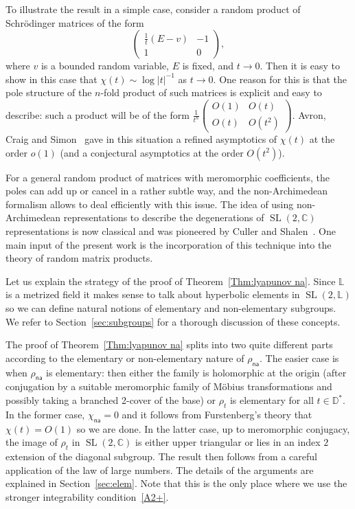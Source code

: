 \documentclass[10pt]{amsart}
\theoremstyle{definition}\newtheorem{defi}[theo]{Definition}\newtheorem{rema}[theo]{Remark}\newtheorem{exam}[theo]{Example}\newtheorem{exem}[theo]{Example}\newtheorem{nota}[theo]{Notation}
\DeclareMathOperator{\SL}{SL}
\newcommand{\D}{\mathbb{D}}
\newcommand{\abs}[1]{\left\vert#1\right\vert}
\newcommand{\Laurent}{\mathbb{L}}
\newcommand{\unsur}[1]{\frac{1}{#1}}
\newcommand{\lrpar}[1]{\left(#1\right)}
\newcommand{\na}{\mathsf{na}}
\newcommand{\SLC}{\SL(2,\mathbb C)}
\newcommand{\inv}{^{-1}}
\begin{document}
To illustrate the result in a simple case, consider a random product of Schr\"odinger matrices of the form
\begin{equation}
\label{eq:schrodinger matrix}
\begin{pmatrix} {\unsur{t}(E-v)} & -1 \\ 1 & 0
\end{pmatrix},
\end{equation}
where $v$ is a bounded random variable, $E$ is fixed, and $t\to 0$. Then it is easy to show in this case that $\chi(t)\sim \log\abs{t}\inv$ as $t\to 0$. One reason for this is that the pole structure of the $n$-fold product of such matrices is explicit and easy to describe: such a product will be of the form $\unsur{t^n}\lrpar{
\begin{smallmatrix} O(1) & O(t) \\ O(t) & O(t^2)
\end{smallmatrix}}$.
Avron, Craig and Simon~\cite{avron-craig-simon} gave in this situation a refined asymptotics of $\chi(t)$ at the order $o(1)$ (and a conjectural asymptotics at the order $O(t^{2})$).

For a general random product of matrices with meromorphic coefficients, the poles can add up or cancel in a rather subtle way, and the non-Archimedean formalism allows to deal efficiently with this issue. The idea of using non-Archimedean representations to describe the degenerations of $\SLC$ representations is now classical and was pioneered by Culler and Shalen~\cite{culler-shalen}. One main input of the present work is the incorporation of this technique into the theory of random matrix products.

Let us explain the strategy of the proof of Theorem~\ref{Thm:lyapunov na}. Since $\Laurent$ is a metrized field it makes sense to talk about hyperbolic elements in $\SL(2,\Laurent)$ so we can define natural notions of elementary and non-elementary subgroups. We refer to Section~\ref{sec:subgroups} for a thorough discussion of these concepts.

The proof of Theorem~\ref{Thm:lyapunov na} splits into two quite different parts according to the elementary or non-elementary nature of $\rho_\na$. The easier case is when $\rho_\na$ is elementary: then either the family is holomorphic at the origin (after conjugation by a suitable meromorphic family of M\"obius transformations and possibly taking a branched 2-cover of the base) or $\rho_t$ is elementary for all $t\in \D^*$. In the former case, $\chi_\na = 0$ and it follows from Furstenberg's theory that $\chi(t) = O(1)$ so we are done. In the latter case, up to meromorphic conjugacy, the image of $\rho_t$ in $\SLC$ is either upper triangular or lies in an index $2$ extension of the diagonal subgroup. The result then follows from a careful application of the law of large numbers. The details of the arguments are explained in Section~\ref{sec:elem}. Note that this is the only place where we use the stronger integrability condition~\eqref{A2+}.
\end{document}

